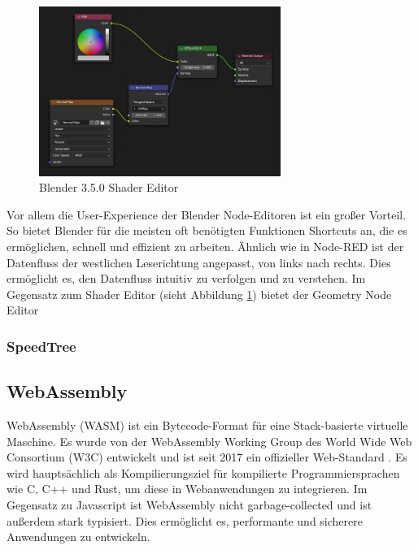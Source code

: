 \documentclass[ngerman]{article}
\begin{document}
\begin{figure}[htbp]
  \centering
  \includegraphics[width=0.7\textwidth]{./graphics/blender-shader.png}
  \caption{Blender 3.5.0 Shader Editor}
  \label{fig:blender-shader}
\end{figure}

Vor allem die User-Experience der Blender Node-Editoren ist ein großer Vorteil. So bietet Blender für die meisten oft benötigten Funktionen Shortcuts an, die es ermöglichen, schnell und effizient zu arbeiten.
\linebreak
\linebreak
Ähnlich wie in Node-RED ist der Datenfluss der westlichen Leserichtung angepasst, von links nach rechts. Dies ermöglicht es, den Datenfluss intuitiv zu verfolgen und zu verstehen.
\linebreak
\linebreak
Im Gegensatz zum Shader Editor (sieht Abbildung \ref{fig:blender-shader}) bietet der Geometry Node Editor


\subsubsection{SpeedTree}

\subsection{WebAssembly}
WebAssembly (WASM) ist ein Bytecode-Format für eine Stack-basierte virtuelle Maschine. Es wurde von der WebAssembly Working Group des World Wide Web Consortium (W3C) entwickelt und ist seit 2017 ein offizieller Web-Standard \cite{Haas2017}. 
\linebreak
\linebreak
Es wird hauptsächlich als Kompilierungsziel für kompilierte Programmiersprachen wie C, C++ und Rust, um diese in Webanwendungen zu integrieren. Im Gegensatz zu Javascript ist WebAssembly nicht garbage-collected und ist außerdem stark typisiert. Dies ermöglicht es, performante und sicherere Anwendungen zu entwickeln.
\end{document}
